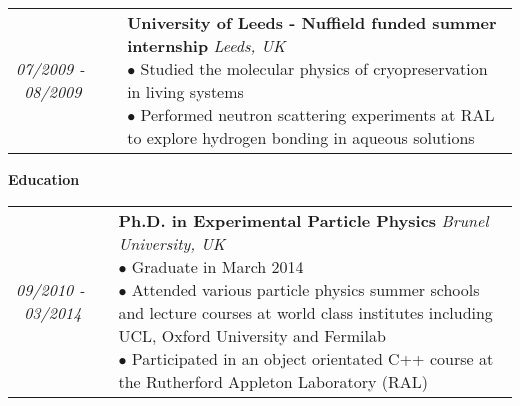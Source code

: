 \documentclass[letterpaper,11pt]{article}
\makeatletter
\newcommand{\resheading}[1]{{\large
\colorbox{mygrey}{\begin{minipage}{\textwidth}{\textbf{#1
\vphantom{p\^{E}}}}\end{minipage}}}\vspace{6pt}}
\newenvironment{entrylist}{%
  \begin{tabular*}{\textwidth}{@{\extracolsep{\fill}}ll}
}{%
  \end{tabular*}
}
\newcommand{\entry}[4]{%
  \textit{#1}&\parbox[t]{14.8cm}{%
    \textbf{#2}%
    \hfill%
    {\footnotesize \textit{\textcolor{mygrey2}{#3}}}\\%
    #4\vspace{12pt}%
  }\\}
\makeatother
\begin{document}
\begin{entrylist}
  \entry
    {07/2009 -~08/2009}
    {University of Leeds - Nuffield funded summer internship}
    {Leeds, UK}
    {$\bullet$ Studied the molecular physics of
    cryopreservation in living systems\\
    $\bullet$ Performed neutron scattering experiments at RAL to explore
    hydrogen bonding in aqueous solutions}
  \entry
    {07/2008 -~08/2008}
    {University of Leeds - EPSRC funded summer internship}
    {Leeds, UK}
    {$\bullet$ Research into drug delivery mechanisms across cell membranes \\
    $\bullet$ Performed electrochemical impedance spectroscopy experiments to
    determine what molecules work best for drug delivery \\
    $\bullet$ This work was published in the \emph{ChemPhysChem} journal} 
    
\end{entrylist}

\pagebreak 

\resheading{Education}

\begin{entrylist}
  \entry
    {09/2010 -~03/2014}
    {Ph.D. in Experimental Particle Physics}
    {Brunel University, UK}
    {$\bullet$ Graduate in March 2014\\
    $\bullet$ Attended various particle physics summer schools and lecture
    courses at world class institutes including UCL, Oxford University and
    Fermilab\\
    $\bullet$ Participated in an object orientated C++ course at the
    Rutherford Appleton Laboratory (RAL) }

   
  \entry
    {09/2006 -~06/2010}
    {M.Sc. in Physics with Astrophysics}
    {University of Leeds, UK}
    {$\bullet$ Graduated with a first class honours degree\\
    $\bullet$ Awarded a scholarship for A-level %
    results}
  
  \entry{09/2003 -~06/2005}{A-Levels}{Stanwell School, UK}{$\bullet$
  Maths (A), Physics (A) and Psychology (A)}

\end{entrylist}
\end{document}
